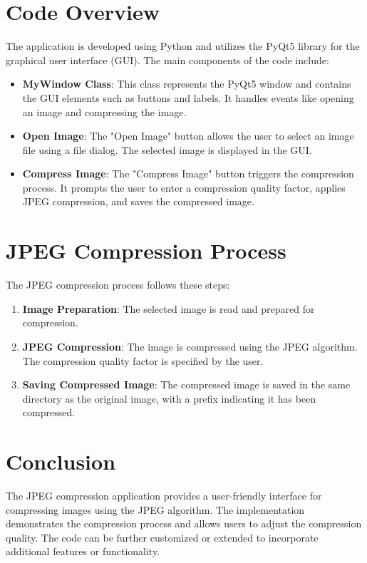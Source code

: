 \documentclass[a4paper,12pt]{article}
\begin{document}
\section{Code Overview}
The application is developed using Python and utilizes the PyQt5 library for the graphical user interface (GUI). The main components of the code include:

\begin{itemize}
  \item \textbf{MyWindow Class}: This class represents the PyQt5 window and contains the GUI elements such as buttons and labels. It handles events like opening an image and compressing the image.
  
  \item \textbf{Open Image}: The "Open Image" button allows the user to select an image file using a file dialog. The selected image is displayed in the GUI.
  
  \item \textbf{Compress Image}: The "Compress Image" button triggers the compression process. It prompts the user to enter a compression quality factor, applies JPEG compression, and saves the compressed image.
\end{itemize}

\section{JPEG Compression Process}
The JPEG compression process follows these steps:

\begin{enumerate}
  \item \textbf{Image Preparation}: The selected image is read and prepared for compression.
  
  \item \textbf{JPEG Compression}: The image is compressed using the JPEG algorithm. The compression quality factor is specified by the user.
  
  \item \textbf{Saving Compressed Image}: The compressed image is saved in the same directory as the original image, with a prefix indicating it has been compressed.
\end{enumerate}

\section{Conclusion}
The JPEG compression application provides a user-friendly interface for compressing images using the JPEG algorithm. The implementation demonstrates the compression process and allows users to adjust the compression quality. The code can be further customized or extended to incorporate additional features or functionality.
\end{document}
